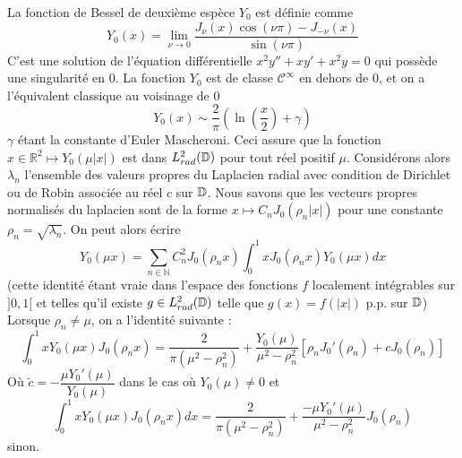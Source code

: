 \documentclass[11pt,a4paper]{article}
\begin{document}
La fonction de Bessel de deuxième espèce $Y_0$ est définie comme \[Y_0(x) = \underset{\nu \to 0}{\lim} \dfrac{J_\nu(x) \cos(\nu \pi) - J_{-\nu}(x)}{\sin(\nu \pi)}\]
C'est une solution de l'équation différentielle $x^2y'' + xy' + x^2y = 0$  qui possède une singularité en $0$. La fonction $Y_0$ est de classe $\mathcal{C}^\infty$ en dehors de $0$, et on a l'équivalent classique au voisinage de $0$ \[ Y_0(x) \sim \frac{2}{\pi}\left(\ln\left(\frac{x}{2}\right) +  \gamma \right)\] $\gamma$ étant la constante d'Euler Mascheroni.  Ceci assure que la fonction $x\in \mathbb{R}^2 \mapsto Y_0(\mu|x|)$ est dans $L^2_{rad}(\mathbb{D})$ pour tout réel positif $\mu$. Considérons alors $\lambda_n$ l'ensemble des valeurs propres du Laplacien radial avec condition de Dirichlet ou de Robin associée au réel $c$ sur $\mathbb{D}$. Nous savons que les vecteurs propres normalisés du laplacien sont de la forme $x \mapsto C_n J_0(\rho_n |x|)$ pour une constante $\rho_n = \sqrt{\lambda_n}$. On peut alors écrire \[Y_0(\mu x) = \sum_{n \in\mathbb{N}}C_n^2 J_0(\rho_n x) \int_{0}^1x J_0(\rho_n x)Y_{0}(\mu x)dx  \] (cette identité étant vraie dans l'espace des fonctions $f$ localement intégrables sur $]0,1[$ et telles qu'il existe $g\in L^2_{rad}(\mathbb{D})$ telle que $g(x) = f(|x|)$ p.p. sur $\mathbb{D}$) 
Lorsque $\rho_n \neq \mu$, on a l'identité suivante : \[ \int_{0}^{1}x Y_{0}(\mu x) J_0(\rho_n x) = \dfrac{2}{\pi(\mu^2 - \rho_n^2)} + \dfrac{Y_0(\mu)}{\mu^2 - \rho_n^2} \left[ \rho_n J_0'(\rho_n) + c J_0(\rho_n)\right]\]
Où $\tilde{c} = -\dfrac{\mu Y_0'(\mu)}{Y_0(\mu)}$ dans le cas où $Y_0(\mu)\neq 0$ et 
\[ \int_{0}^{1}x Y_{0}(\mu x) J_0(\rho_n x)dx = \dfrac{2}{\pi(\mu^2 - \rho_n^2)} + \dfrac{- \mu Y_0'(\mu)}{\mu^2 - \rho_n^2} J_0(\rho_n)\] sinon.
\end{document}
